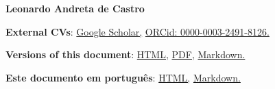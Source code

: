 \documentclass[a4paper]{article}
\begin{document}
\begin{center}\bf\huge Leonardo Andreta de Castro\end{center}

\begin{center}  \textbf{External CVs}:  \href{https://scholar.google.com/citations?user=7GGkIQgAAAAJ}{Google Scholar,} \href{https://orcid.org/0000-0003-2491-8126}{ORCid: 0000-0003-2491-8126.}   \end{center}

\begin{center}  \textbf{Versions of this document}:  \href{https://leoadec.github.io/}{HTML,} \href{https://leoadec.github.io/resume.pdf}{PDF,} \href{https://github.com/leoadec/leoadec.github.io/blob/master/README.md}{Markdown.}   \end{center}

\begin{center}  \textbf{Este documento em português}:  \href{https://leoadec.github.io/portugues/}{HTML,} \href{https://github.com/leoadec/leoadec.github.io/blob/master/portugues/LEIAME.md}{Markdown.}   \end{center}
\end{document}
